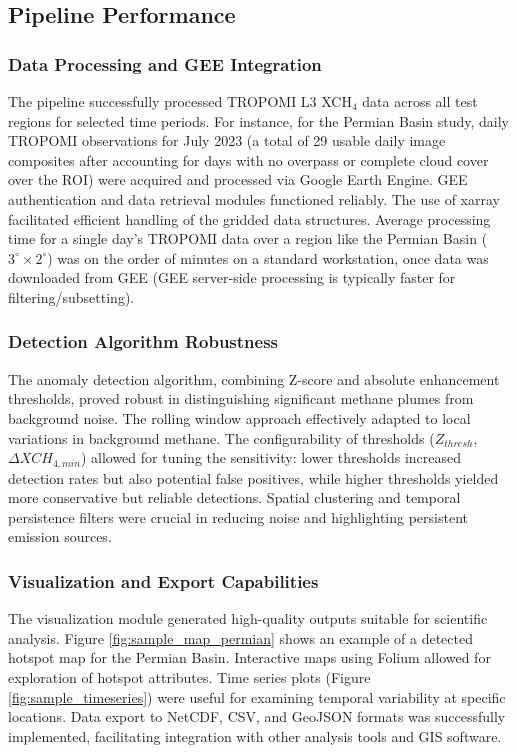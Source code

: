 \documentclass[12pt,a4paper]{article}
\begin{document}
\subsection{Pipeline Performance}
\subsubsection{Data Processing and GEE Integration}
The pipeline successfully processed TROPOMI L3 XCH$_4$ data across all test regions for selected time periods. For instance, for the Permian Basin study, daily TROPOMI observations for July 2023 (a total of 29 usable daily image composites after accounting for days with no overpass or complete cloud cover over the ROI) were acquired and processed via Google Earth Engine. GEE authentication and data retrieval modules functioned reliably. The use of xarray facilitated efficient handling of the gridded data structures. Average processing time for a single day's TROPOMI data over a region like the Permian Basin ($3^\circ \times 2^\circ$) was on the order of minutes on a standard workstation, once data was downloaded from GEE (GEE server-side processing is typically faster for filtering/subsetting).

\subsubsection{Detection Algorithm Robustness}
The anomaly detection algorithm, combining Z-score and absolute enhancement thresholds, proved robust in distinguishing significant methane plumes from background noise. The rolling window approach effectively adapted to local variations in background methane. The configurability of thresholds ($Z_{thresh}$, $\Delta XCH_{4,min}$) allowed for tuning the sensitivity: lower thresholds increased detection rates but also potential false positives, while higher thresholds yielded more conservative but reliable detections. Spatial clustering and temporal persistence filters were crucial in reducing noise and highlighting persistent emission sources.

\subsubsection{Visualization and Export Capabilities}
The visualization module generated high-quality outputs suitable for scientific analysis. Figure \ref{fig:sample_map_permian} shows an example of a detected hotspot map for the Permian Basin. Interactive maps using Folium allowed for exploration of hotspot attributes. Time series plots (Figure \ref{fig:sample_timeseries}) were useful for examining temporal variability at specific locations. Data export to NetCDF, CSV, and GeoJSON formats was successfully implemented, facilitating integration with other analysis tools and GIS software.
\end{document}
